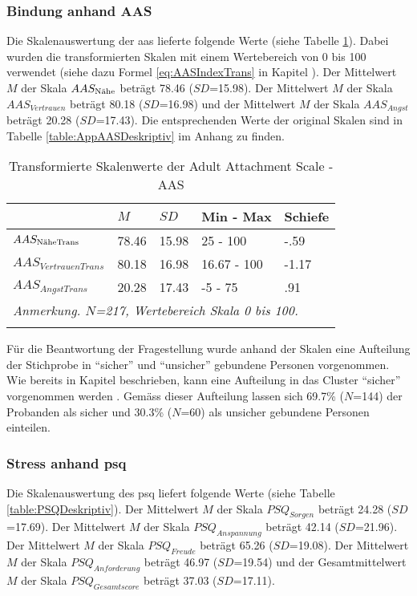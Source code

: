 \subsubsection{Bindung anhand AAS}
Die Skalenauswertung der \acrfull{aas} lieferte folgende Werte (siehe Tabelle \ref{table:AASDeskriptivTrans}). Dabei wurden die transformierten Skalen mit einem Wertebereich von 0 bis 100 verwendet (siehe dazu Formel \ref{eq:AASIndexTrans} in Kapitel \textit{}). Der Mittelwert $M$ der Skala $AAS_{\textnormal{Nähe}}$ beträgt 78.46 ($SD$=15.98). Der Mittelwert $M$ der Skala $AAS_{Vertrauen}$ beträgt 80.18 ($SD$=16.98) und der Mittelwert  $M$ der Skala $AAS_{Angst}$ beträgt 20.28 ($SD$=17.43). Die entsprechenden Werte der original Skalen sind in Tabelle \ref{table:AppAASDeskriptiv} im Anhang zu finden.

\begin{table}%
\begin{tabular}{m{7em} m{3em}  m{3em}  m{5em} m{3em}} 
  \hline
  & $M$ & $SD$ & Min - Max & Schiefe\\
  \hline
  $AAS_{\textit{\textnormal{NäheTrans}}}$ & 78.46 & 15.98 & 25 - 100 & -.59\\
  $AAS_{VertrauenTrans}$ & 80.18 & 16.98 & 16.67 - 100 & -1.17\\
  $AAS_{AngstTrans}$ & 20.28 & 17.43 & -5 - 75 & .91 \\
  \hline
  \multicolumn{5}{l}{\textit{Anmerkung. $N$=217, Wertebereich Skala 0 bis 100.}}\\
  &&&&\\
\end{tabular}
\caption{Transformierte Skalenwerte der Adult Attachment Scale - AAS}
\label{table:AASDeskriptivTrans}
\end{table}

Für die Beantwortung der Fragestellung wurde anhand der Skalen eine Aufteilung der Stichprobe in \enquote{sicher} und \enquote{unsicher} gebundene Personen vorgenommen. Wie bereits in Kapitel \textit{} beschrieben, kann eine Aufteilung in das Cluster \enquote{sicher} vorgenommen werden \cite{Schuetzmann2004}. Gemäss dieser Aufteilung lassen sich 69.7\% ($N$=144) der Probanden als sicher und 30.3\% ($N$=60) als unsicher gebundene Personen einteilen. 

\subsubsection{Stress anhand \acrshort{psq}}
Die Skalenauswertung des \acrfull{psq} liefert folgende Werte (siehe Tabelle \ref{table:PSQDeskriptiv}). Der Mittelwert $M$ der Skala $PSQ_{Sorgen}$ beträgt 24.28 ($SD$=17.69). Der Mittelwert $M$ der Skala $PSQ_{Anspannung}$ beträgt 42.14 ($SD$=21.96). Der Mittelwert $M$ der Skala $PSQ_{Freude}$ beträgt 65.26 ($SD$=19.08). Der Mittelwert $M$ der Skala $PSQ_{Anforderung}$ beträgt 46.97 ($SD$=19.54) und der Gesamtmittelwert $M$ der Skala $PSQ_{Gesamtscore}$ beträgt 37.03 ($SD$=17.11).

